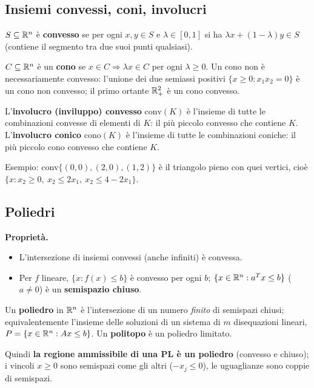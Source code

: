 \subsection{Insiemi convessi, coni, involucri}
\begin{defbox}
$S\subseteq\mathbb{R}^n$ è \textbf{convesso} se per ogni $x,y\in S$ e $\lambda\in[0,1]$ si ha $\lambda x+(1-\lambda)y\in S$ (contiene il segmento tra due suoi punti qualsiasi).
\end{defbox}
\begin{defbox}[cono]
$C\subseteq\mathbb{R}^n$ è un \textbf{cono} se $x\in C\Rightarrow \lambda x\in C$ per ogni $\lambda\ge0$. Un cono non è necessariamente convesso: l'unione dei due semiassi positivi $\{x\ge0: x_1x_2=0\}$ è un cono non convesso; il primo ortante $\mathbb{R}^2_+$ è un cono convesso.
\end{defbox}
\begin{defbox}
L'\textbf{involucro (inviluppo) convesso} $\mathrm{conv}(K)$ è l'insieme di tutte le combinazioni convesse di elementi di $K$: il più piccolo convesso che contiene $K$. L'\textbf{involucro conico} $\mathrm{cono}(K)$ è l'insieme di tutte le combinazioni coniche: il più piccolo cono convesso che contiene $K$.
\end{defbox}
Esempio: $\mathrm{conv}\{(0,0),(2,0),(1,2)\}$ è il triangolo pieno con quei vertici, cioè $\{x: x_2\ge0,\ x_2\le2x_1,\ x_2\le4-2x_1\}$.

\subsection{Poliedri}
\textbf{Proprietà.}
\begin{itemize}[nosep]
\item L'intersezione di insiemi convessi (anche infiniti) è convessa.
\item Per $f$ lineare, $\{x: f(x)\le b\}$ è convesso per ogni $b$; $\{x\in\mathbb{R}^n: a^Tx\le b\}$ ($a\ne0$) è un \textbf{semispazio chiuso}.
\end{itemize}
\begin{defbox}
Un \textbf{poliedro} in $\mathbb{R}^n$ è l'intersezione di un numero \emph{finito} di semispazi chiusi; equivalentemente l'insieme delle soluzioni di un sistema di $m$ disequazioni lineari, $P=\{x\in\mathbb{R}^n: Ax\le b\}$. Un \textbf{politopo} è un poliedro limitato.
\end{defbox}
Quindi \textbf{la regione ammissibile di una PL è un poliedro} (convesso e chiuso); i vincoli $x\ge0$ sono semispazi come gli altri ($-x_j\le0$), le uguaglianze sono coppie di semispazi.

